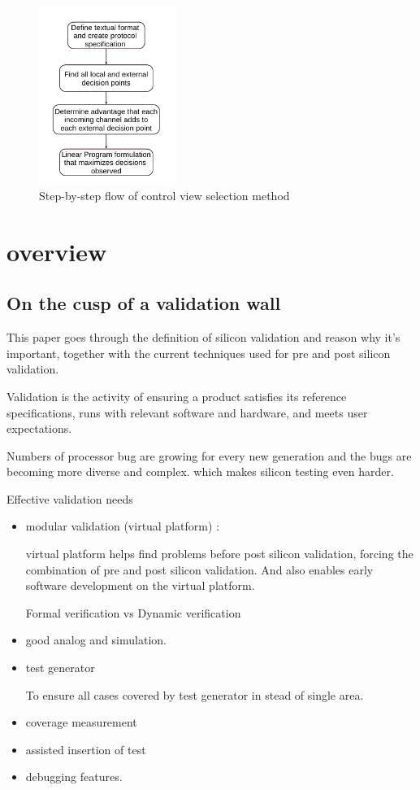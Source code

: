 \documentclass[conference]{IEEEtran}
\begin{document}
\begin{figure}
\caption{Step-by-step flow of control view selection method}
\label{control}
\centering
    \includegraphics[width=0.4\textwidth]{control}
\end{figure}



\section{overview}
\subsection{On the cusp of a validation wall~\cite{validationWall}}
This paper goes through the definition of silicon validation and reason why it's important, together with the current techniques used for pre and post silicon validation.

Validation is the activity of ensuring a product satisfies its reference specifications, runs with relevant software and hardware, and meets user expectations.

Numbers of processor bug are growing for every new generation and the bugs are becoming more diverse and complex. which makes silicon testing even harder.

Effective validation needs
\begin{itemize}
\item modular validation (virtual platform) :

virtual platform helps find problems before post silicon validation, forcing the combination of pre and post silicon validation. And also enables early software development on the virtual platform.

Formal verification vs Dynamic verification
\item good analog and simulation.
\item test generator

To ensure all cases covered by test generator in stead of single area.
\item coverage measurement
\item assisted insertion of test
\item debugging features.
\end{itemize}
\end{document}

